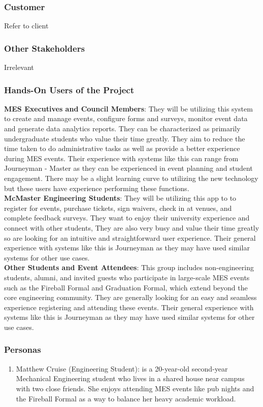 \documentclass[12pt]{article}
\begin{document}
\subsubsection{Customer}
Refer to client
\subsubsection{Other Stakeholders}
Irrelevant
\subsubsection{Hands-On Users of the Project}
\textbf{MES Executives and Council Members}: They will be utilizing this system to create and manage events, configure forms and surveys, monitor event data and generate data analytics reports. They can be characterized as primarily undergraduate students who value their time greatly. They aim to reduce the time taken to do administrative tasks as well as provide a better experience during MES events. Their experience with systems like this can range from Journeyman - Master as they can be experienced in event planning and student engagement. There may be a slight learning curve to utilizing the new technology but these users have experience performing these functions.\\
\newline
\textbf{McMaster Engineering Students}: They will be utilizing this app to to register for events, purchase tickets, sign waivers, check in at venues, and complete feedback surveys. They want to enjoy their university experience and connect with other students, They are also very busy and value their time greatly so are looking for an intuitive and straightforward user experience. Their general experience with systems like this is Journeyman as they may have used similar systems for other use cases. \\
\newline
\textbf{Other Students and Event Attendees}: This group includes non-engineering students, alumni, and invited guests who participate in large-scale MES events such as the Fireball Formal and Graduation Formal, which extend beyond the core engineering community. They are generally looking for an easy and seamless experience registering and attending these events. Their general experience with systems like this is Journeyman as they may have used similar systems for other use cases.
\subsubsection{Personas}
\begin{enumerate}
  \item Matthew Cruise (Engineering Student): is a 20-year-old second-year Mechanical Engineering student who lives in a shared house near campus with two close friends. She enjoys attending MES events like pub nights and the Fireball Formal as a way to balance her heavy academic workload. 
\end{enumerate}
\end{document}
